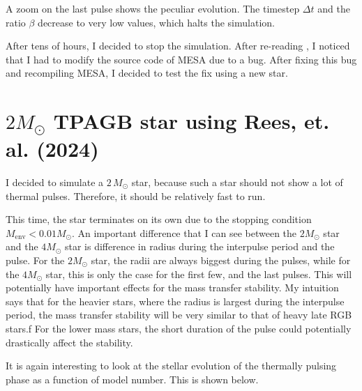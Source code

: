 \documentclass[a4paper,10pt]{article}
\begin{document}
\begin{figure}[ht]
    \centering
\end{figure}

A zoom on the last pulse shows the peculiar evolution. The timestep \(\Delta t\) and the ratio \(\beta \) decrease to very low values, which halts the simulation.
\begin{figure}[ht]
    \centering
\end{figure}

After tens of hours, I decided to stop the simulation. 
After re-reading \citet{rees2024b}, I noticed that I had to modify the source code of MESA due to a bug. 
After fixing this bug and recompiling MESA, I decided to test the fix using a new star.


\newpage
\section{\texorpdfstring{$2 M_\odot $}{2 solar mass} TPAGB star using Rees, et. al. (2024)}

I decided to simulate a \(2\, M_\odot \) star, because such a star should not show a lot of thermal pulses. Therefore, it should be relatively fast to run.

\begin{figure}[ht]
    \centering
\end{figure}

This time, the star terminates on its own due to the stopping condition \(M _\text{env} < 0.01 M_\odot \). An important difference that I can see between the \(2 M_\odot \) star and the \(4M_\odot \) star is difference in radius during the interpulse period and the pulse.
For the \(2 M_\odot \) star, the radii are always biggest during the pulses, while for the \(4M_\odot \) star, this is only the case for the first few, and the last pulses.
This will potentially have important effects for the mass transfer stability.
My intuition says that for the heavier stars, where the radius is largest during the interpulse period, the mass transfer stability will be very similar to that of heavy late RGB stars.f
For the lower mass stars, the short duration of the pulse could potentially drastically affect the stability.

It is again interesting to look at the stellar evolution of the thermally pulsing phase as a function of model number. This is shown below.
\begin{figure}[ht]
    \centering
\end{figure}
\end{document}
